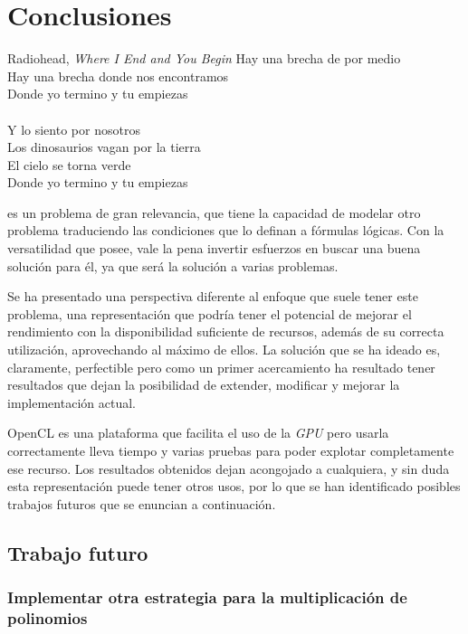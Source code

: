 \chapter{Conclusiones}

\begin{chapquote}{Radiohead, \textit{Where I End and You Begin}}
\noindent
Hay una brecha de por medio\\
Hay una brecha donde nos encontramos\\
Donde yo termino y tu empiezas\\
\\
Y lo siento por nosotros\\
Los dinosaurios vagan por la tierra\\
El cielo se torna verde\\
Donde yo termino y tu empiezas
\end{chapquote}

\sat es un problema de gran relevancia, que tiene la capacidad de modelar otro problema traduciendo las condiciones que lo definan a fórmulas lógicas. Con la versatilidad que posee, vale la pena invertir esfuerzos en buscar una buena solución para él, ya que será la solución a varias problemas.

Se ha presentado una perspectiva diferente al enfoque que suele tener este problema, una representación que podría tener el potencial de mejorar el rendimiento con la disponibilidad suficiente de recursos, además de su correcta utilización, aprovechando al máximo de ellos. La solución que se ha ideado es, claramente, perfectible pero como un primer acercamiento ha resultado tener resultados que dejan la posibilidad de extender, modificar y mejorar la implementación actual.

OpenCL es una plataforma que facilita el uso de la \textit{GPU} pero usarla correctamente lleva tiempo y varias pruebas para poder explotar completamente ese recurso. Los resultados obtenidos dejan acongojado a cualquiera, y sin duda esta representación puede tener otros usos, por lo que se han identificado posibles trabajos futuros que se enuncian a continuación.

\section{Trabajo futuro}

\subsection{Implementar otra estrategia para la multiplicación de polinomios}

